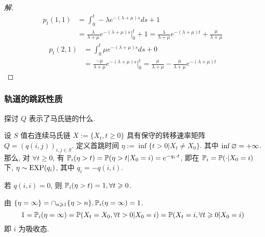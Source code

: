 \begin{proof}[解]
\[    \]
    \[
    \begin{aligned}
        p_t(1,1)&=\int_0^t -\lambda e^{-(\lambda +\mu)s}ds+1\\
        &=\frac{\lambda}{\lambda +\mu}e^{-(\lambda+\mu)s}\bigg|_0^t+1=\frac{\lambda}{\lambda+\mu}e^{-(\lambda+\mu)t}+\frac{\mu}{\lambda+\mu}
    \end{aligned}
    \]
    \[
    \begin{aligned}
        p_t(2,1)&=\int_0^t \mu e^{-(\lambda +\mu)s}ds+0\\
        &=\frac{-\mu}{\lambda +\mu}e^{-(\lambda+\mu)s}\bigg|_0^t=\frac{\mu}{\lambda+\mu}-\frac{\mu}{\lambda+\mu}e^{-(\lambda+\mu)t}
    \end{aligned}
    \]
\end{proof}

\subsubsection{轨道的跳跃性质}

探讨 $Q$ 表示了马氏链的什么.

\begin{theorem}\label{thm:p127-thm5}
    设 $S$ 值右连续马氏链 $X:=\{X_t,t\geq 0\}$ 具有保守的转移速率矩阵 $Q=(q(i,j))_{i,j\in S}$. 定义首跳时间 $\eta:=\inf \{t>0|X_t\neq X_0\}$. 其中 $\inf \varnothing=+\infty$. 那么, 对 $\forall t\geq 0$, 有 $\mathbb{P}_i(\eta>t)=\mathbb{P}(\eta>t|X_0=i)=e^{-q_i\cdot t}$, 即在 $\mathbb{P}_i=\mathbb{P}(\cdot|X_0=i)$ 下, $\eta\sim \operatorname{EXP}(q_i)$, 其中 $q_i=-q(i,i)$.
\end{theorem}

\begin{corollary}
    若 $q(i,i)=0$, 则 $\mathbb{P}_i(\eta>t)=1, \forall t\geqslant 0$. 
\end{corollary}
由 $\{\eta=\infty\}=\cap_{n\geqslant 1}\{\eta >n\}, \mathbb{P}_i(\eta=\infty)=1$.
\[
    1=\mathbb{P}_i(\eta=\infty)=\mathbb{P}(X_t=X_0,\forall t>0|X_0=i)=\mathbb{P}(X_t=i,\forall t\geqslant 0|X_0=i)
\]
即 $i$ 为吸收态.


